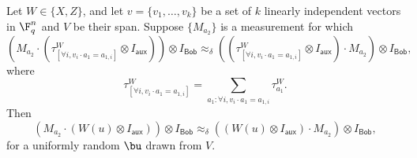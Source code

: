 \documentclass[11pt]{article}
\newcommand{\reg}[1]{{\mathsf{#1}}}
\begin{document}
\begin{lemma}\label{lem:proj-to-obs-subspace}
Let $W \in \{X, Z\}$, and let $v = \{v_1, \dots, v_k\}$ be a set of
$k$ linearly independent vectors in $\F_q^n$ and $V$ be their span.
Suppose $\{M_{a_2}\}$ is a measurement for which
\begin{equation}\label{eq:m-commutes-subspace-proj}
(M_{a_2} \cdot (\tau^{W}_{[\forall i, v_i \cdot a_1 = a_{1,i}]} \otimes I_{\reg{aux}})) \otimes I_{\reg{Bob}}
\approx_{\delta} ((\tau^{W}_{[\forall i, v_i \cdot a_1 = a_{1,i}]} \otimes I_{\reg{aux}}) \cdot M_{a_2}) \otimes I_{\reg{Bob}},
\end{equation}
where
\[ \tau^{W}_{[\forall i, v_i \cdot a_1 = a_{1,i}]} = \sum_{a_1 :
    \forall i, v_i \cdot a_1 = a_{1,i}} \tau^W_{a_1}. \]
Then
\begin{equation*}
(M_{a_2} \cdot (W(u)\otimes I_{\reg{aux}})) \otimes I_{\reg{Bob}}
\approx_{\delta} ((W(u) \otimes I_{\reg{aux}}) \cdot M_{a_2}) \otimes I_{\reg{Bob}},
\end{equation*}
for a uniformly random $\bu$ drawn from $V$.
\end{lemma}
\end{document}
